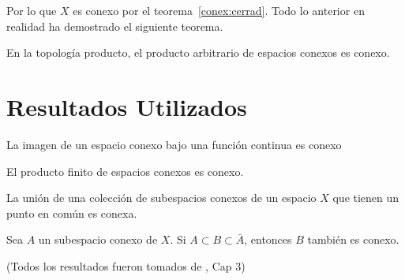 \documentclass[fleqn,leqno,letterpaper,11pt,final]{article}
\begin{document}
Por lo que $X$ es conexo por el teorema~\ref{conex:cerrad}. Todo lo anterior en realidad ha demostrado
el siguiente teorema.
\begin{teo}
	En la topología producto, el producto arbitrario de espacios conexos es conexo.	
\end{teo}


\section{Resultados Utilizados}
\begin{teo}\label{conex:contfunct}
	La imagen de un espacio conexo bajo una función continua es conexo
\end{teo}
\begin{teo}\label{conex:prod}
	El producto finito de espacios conexos es conexo.
\end{teo}
\begin{teo}\label{conex:union}
	La unión de una colección de subespacios conexos de un espacio $X$ que tienen un
	punto en común es conexa.
\end{teo}
\begin{teo}\label{conex:cerrad}
	Sea $A$ un subespacio conexo de $X$. Si $A\subset B\subset\bar A$, entonces $B$
	también es conexo.
\end{teo}
\begin{flushright}\scriptsize
	(Todos los resultados fueron tomados de \cite{munkres_topology_2014}, Cap 3)
\end{flushright}

\printbibliography[
heading=bibintoc,
title={Referencias}
]
\end{document}
